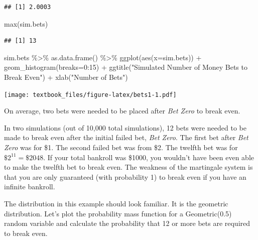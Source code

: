 \documentclass[
  11pt,
]{book}
\newenvironment{Shaded}{\begin{snugshade}}{\end{snugshade}}
\newcommand{\AttributeTok}[1]{\textcolor[rgb]{0.77,0.63,0.00}{#1}}
\newcommand{\DecValTok}[1]{\textcolor[rgb]{0.00,0.00,0.81}{#1}}
\newcommand{\FunctionTok}[1]{\textcolor[rgb]{0.00,0.00,0.00}{#1}}
\newcommand{\NormalTok}[1]{#1}
\newcommand{\SpecialCharTok}[1]{\textcolor[rgb]{0.00,0.00,0.00}{#1}}
\newcommand{\StringTok}[1]{\textcolor[rgb]{0.31,0.60,0.02}{#1}}
\theoremstyle{definition}
\theoremstyle{definition}
\theoremstyle{definition}
\theoremstyle{definition}
\theoremstyle{remark}
\begin{document}
\begin{verbatim}
## [1] 2.0003
\end{verbatim}

\begin{Shaded}
\begin{Highlighting}[]
\FunctionTok{max}\NormalTok{(sim.bets)}
\end{Highlighting}
\end{Shaded}

\begin{verbatim}
## [1] 13
\end{verbatim}

\begin{Shaded}
\begin{Highlighting}[]
\NormalTok{sim.bets }\SpecialCharTok{\%\textgreater{}\%} \FunctionTok{as.data.frame}\NormalTok{() }\SpecialCharTok{\%\textgreater{}\%} 
  \FunctionTok{ggplot}\NormalTok{(}\FunctionTok{aes}\NormalTok{(}\AttributeTok{x=}\NormalTok{sim.bets)) }\SpecialCharTok{+} 
  \FunctionTok{geom\_histogram}\NormalTok{(}\AttributeTok{breaks=}\DecValTok{0}\SpecialCharTok{:}\DecValTok{15}\NormalTok{) }\SpecialCharTok{+}
  \FunctionTok{ggtitle}\NormalTok{(}\StringTok{"Simulated Number of Money Bets to Break Even"}\NormalTok{) }\SpecialCharTok{+} 
  \FunctionTok{xlab}\NormalTok{(}\StringTok{"Number of Bets"}\NormalTok{)}
\end{Highlighting}
\end{Shaded}

\texttt{[image: textbook\_files/figure-latex/bets1-1.pdf]}

On average, two bets were needed to be placed after \emph{Bet Zero} to break even.

\newpage

In two simulations (out of 10,000 total simulations), 12 bets were needed to be made to break even after the initial failed bet, \emph{Bet Zero}. The first bet after \emph{Bet Zero} was for \$1. The second failed bet was from \$2. The twelfth bet was for \(\$2^{11} = \$2048\). If your total bankroll was \$1000, you wouldn't have been even able to make the twelfth bet to break even. The weakness of the martingale system is that you are only guaranteed (with probability 1) to break even if you have an infinite bankroll.

The distribution in this example should look familiar. It is the geometric distribution. Let's plot the probability mass function for a Geometric(0.5) random variable and calculate the probability that 12 or more bets are required to break even.
\end{document}
